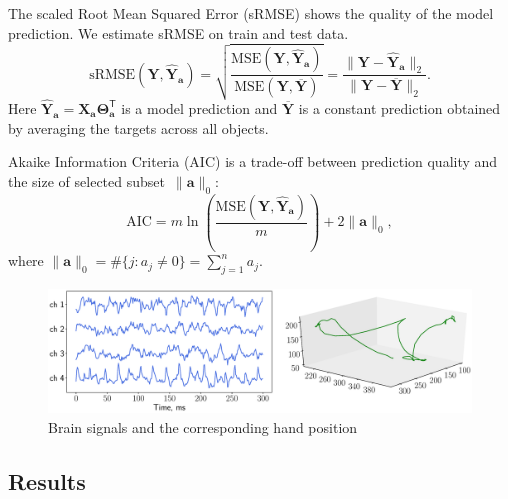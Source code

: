 \documentclass[12pt,oneside]{article}
\theoremstyle{definition}
\newcommand{\ba}{\mathbf{a}}
\newcommand{\bY}{\mathbf{Y}}
\newcommand{\bX}{\mathbf{X}}
\newcommand{\T}{\mathsf{T}}
\newcommand{\bTheta}{\boldsymbol{\Theta}}
\begin{document}
The scaled Root Mean Squared Error (sRMSE) shows the quality of the model prediction. We estimate sRMSE on train and test data.
\begin{equation}
\text{sRMSE}(\bY, \widehat{\bY}_{\ba}) = \sqrt{\frac{\text{MSE} (\bY, \widehat{\bY}_{\ba})}{\text{MSE} (\bY, \overline{\bY})}} =  \frac{\| \bY - \widehat{\bY}_{\ba} \|_2}{\| \bY - \overline{\bY} \|_2}.
\end{equation}
Here $\widehat{\bY}_{\ba} = \bX_{\ba} \bTheta_{\ba}^{\T}$ is a model prediction and $\overline{\bY}$ is a constant prediction obtained by averaging the targets across all objects.

Akaike Information Criteria (AIC) is a trade-off between prediction quality and the size of selected subset~$\|\ba\|_0$:
\begin{equation}
\text{AIC} = m \ln \left( \frac{\text{MSE} ( \bY, \widehat{\bY}_{\ba})}{m}\right) + 2 \| \ba \|_0,
\end{equation}
where $\|\ba\|_0 = \#\{j: a_j \neq 0\}= \sum_{j=1}^n a_j$.

\begin{figure}
	\centering
	\includegraphics[width=\linewidth]{figs/ecog_data}
	\caption{Brain signals and the corresponding hand position}
	\label{fig:ecog_data}
\end{figure}

\subsection{Results}
\end{document}
